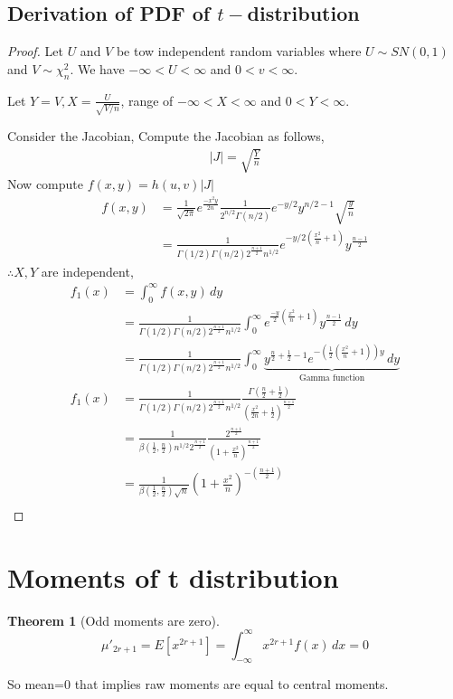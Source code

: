 \documentclass[oneside,11pt,pdftex]{book}%
\numberwithin{equation}{section}
\newtheorem{theorem}{Theorem}[chapter]%
\numberwithin{section}{chapter}
\numberwithin{equation}{chapter}
\begin{document}
\subsection{Derivation of PDF of $ t- $distribution}
\begin{proof}
	Let $ U $ and $ V $ be tow independent random variables where $ U \sim SN(0,1) $ and $ V \sim \chi^2_n $. We have $ -\infty < U < \infty $ and $ 0<v< \infty $.
	
	Let $ Y=V, X=\frac{U}{\sqrt{V/n}} $, range of $-\infty< X < \infty$ and $ 0<Y<\infty $.
	
	Consider the Jacobian,
	Compute the Jacobian as follows,
	\begin{align*}
		|J|=\sqrt{\frac{Y}{n}}
	\end{align*}
	Now compute $ f(x,y) =h(u,v) |J|$
	\begin{align*}
		f(x,y)&=\frac{1}{\sqrt{2 \pi}}e^{\frac{-x^2y}{2n}}\frac{1}{2^{n/2}\Gamma(n/2)}e^{-y/2}y^{n/2-1} \sqrt{\frac{y}{n}}\\
		&=\frac{1}{\Gamma(1/2)\Gamma(n/2)2^{\frac{n+1}{2}}n^{1/2}}e^{-y/2\left(\frac{x^2}{n}+1\right)}y^{\frac{n-1}{2}}
	\end{align*}
	$ \therefore X, Y $ are independent,
	\begin{align*}
		f_1(x)&=\int_0^\infty f(x,y)\, dy\\
		&=\frac{1}{\Gamma(1/2)\Gamma(n/2)2^{\frac{n+1}{2}}n^{1/2}} \int_0^\infty e^{\frac{-y}{2}\left( \frac{x^2}{n}+1 \right)}y^{\frac{n-1}{2}}\, dy\\
		&=\frac{1}{\Gamma(1/2)\Gamma(n/2)2^{\frac{n+1}{2}}n^{1/2}} \int_0^\infty \underbrace{y^{\frac{n}{2}+\frac{1}{2}-1}e^{-\left(\frac{1}{2}\left(\frac{x^2}{n}+1\right)\right)y}\, dy}_{\text{Gamma function}}\\
		f_1(x)&=\frac{1}{\Gamma(1/2)\Gamma(n/2)2^{\frac{n+1}{2}}n^{1/2}} \frac{\Gamma\left(\frac{n}{2}+\frac{1}{2} \right)}{\left(\frac{x^2}{2n}+\frac{1}{2}\right)^\frac{n+1}{2}}\\
		&=\frac{1}{\beta\left(\frac{1}{2},\frac{n}{2}\right)n^{1/2}2^{\frac{n+1}{2}}}\frac{2^{\frac{n+1}{2}}}{\left(1+\frac{x^2}{n}\right)^{\frac{n+1}{2}}}\\
		&=\frac{1}{\beta\left(\frac{1}{2}, \frac{n}{2}\right) \sqrt{n}} \left(1+\frac{x^2}{n}\right)^{-\left(\frac{n+1}{2}\right)}\\
	\end{align*}
\end{proof}

\section{Moments of t distribution}
\begin{theorem}[Odd moments are zero]
	\[ \mu'_{2r+1}=E[x^{2r+1}]=\int_{-\infty}^\infty x^{2r+1}f(x)\, dx =0\]
\end{theorem}
So mean=0 that implies raw moments are equal to central moments.
\end{document}

